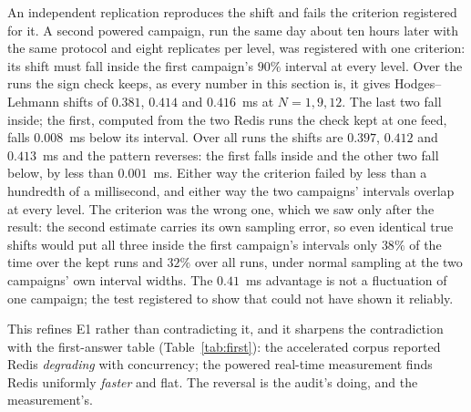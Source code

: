 \documentclass[10pt,journal,onecolumn]{IEEEtran}
\newcommand{\redis}{Redis}
\begin{document}
An independent replication reproduces the shift and fails the criterion registered for it. A
second powered campaign, run the same day about ten hours later with the same protocol and eight
replicates per level, was registered with one criterion: its shift must fall inside the first
campaign's $90\%$ interval at every level. Over the runs the sign check keeps, as every number in
this section is, it gives Hodges--Lehmann shifts of $0.381$, $0.414$ and $0.416$~ms at
$N = 1, 9, 12$. The last two fall inside; the first, computed from the two \redis{} runs the check
kept at one feed, falls $0.008$~ms below its interval. Over all runs the shifts are $0.397$,
$0.412$ and $0.413$~ms and the pattern reverses: the first falls inside and the other two fall
below, by less than $0.001$~ms. Either way the criterion failed by less than a hundredth of a
millisecond, and either way the two campaigns' intervals overlap at every level. The criterion
was the wrong one, which we saw only after the result: the second estimate carries its own
sampling error, so even identical true shifts would put all three inside the first campaign's
intervals only $38\%$ of the time over the kept runs and $32\%$ over all runs, under normal
sampling at the two campaigns' own interval widths. The $0.41$~ms advantage is not a fluctuation
of one campaign; the test registered to show that could not have shown it reliably.


This refines E1 rather than contradicting it, and it sharpens the contradiction with
the first-answer table (Table~\ref{tab:first}): the accelerated corpus reported \redis{} \emph{degrading} with concurrency;
the powered real-time measurement finds \redis{} uniformly \emph{faster} and flat. The reversal is
the audit's doing, and the measurement's.
\end{document}
